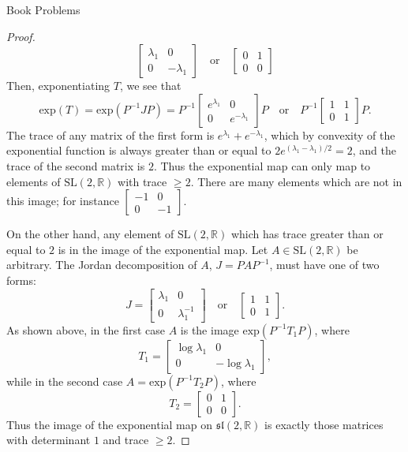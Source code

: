 \documentclass[12pt]{article}
\newcommand{\R}{\mathbb{R}}
\theoremstyle{definition}
\begin{document}
\begin{section}{Book Problems}
\begin{proof}
\[\begin{bmatrix}
		\lambda_1 & 0\\
		0 & -\lambda_1
	\end{bmatrix}\quad\text{or}\quad \begin{bmatrix}
	0 & 1\\
	0 & 0
\end{bmatrix}\]
Then, exponentiating $T$, we see that 
\[\text{exp}(T) = \text{exp}(P^{-1}JP) = P^{-1}\begin{bmatrix}
		e^{\lambda_1} & 0\\
		0 & e^{-\lambda_1}
	\end{bmatrix}P\quad\text{or}\quad P^{-1}\begin{bmatrix}
	1 & 1\\
	0 & 1
\end{bmatrix}P.\]
The trace of any matrix of the first form is $e^{\lambda_1} + e^{-\lambda_1}$, which by convexity of the exponential function is always greater than or equal to $2e^{(\lambda_1 - \lambda_1)/2} = 2$, and the trace of the second matrix is $2$. Thus the exponential map can only map to elements of $\text{SL}(2, \R)$ with trace $\geq 2$. There are many elements which are not in this image; for instance $\begin{bmatrix}	-1 & 0 \\ 0 & -1 \end{bmatrix}$.
\par On the other hand, any element of $\text{SL}(2,\R)$ which has trace greater than or equal to $2$ is in the image of the exponential map. Let $A \in \text{SL}(2, \R)$ be arbitrary. The Jordan decomposition of $A$, $J = PAP^{-1}$, must have one of two forms:
\[ J = \begin{bmatrix}
	\lambda_1 & 0 \\
	0 & \lambda_1^{-1}
\end{bmatrix} \quad \text{or}\quad \begin{bmatrix}
1 & 1\\
0 & 1
\end{bmatrix}.\]
As shown above, in the first case $A$ is the image $\text{exp}(P^{-1}T_1P)$, where 
\[ T_1 = \begin{bmatrix}
	\log\lambda_1 & 0 \\
	0 & -\log\lambda_1
\end{bmatrix},\]
while in the second case $A = \text{exp}(P^{-1}T_2P)$, where
\[T_2 = \begin{bmatrix}
	0 & 1 \\
	0 & 0
\end{bmatrix}.\]
Thus the image of the exponential map on $\mathfrak{sl}(2, \R)$ is exactly those matrices with determinant $1$ and trace $\geq 2$.  

\end{proof}
\end{section}
\end{document}
